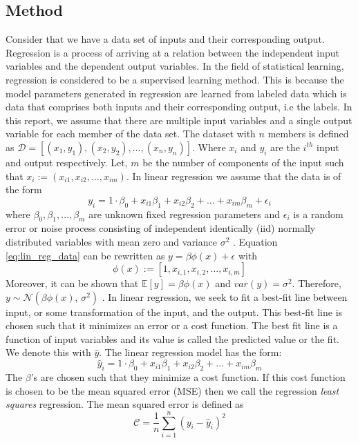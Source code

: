 \subsection{Method} \label{subsec:method_linear_regression}

Consider that we have a data set of inputs and their corresponding output. Regression is a process of arriving at a relation between the independent input variables and the dependent output variables. In the field of statistical learning, regression is considered to be a supervised learning method. This is because the model parameters generated in regression are learned from labeled data which is data that comprises both inputs and their corresponding output, i.e the labels. In this report, we assume that there are multiple input variables and a single output variable for each member of the data set.
\newline \newline
The dataset with $n$ members is defined as $\mathcal{D} = [({x}_1, y_1 ), ({x}_2, y_2 ), ..., ({x}_n, y_n )]$. Where ${x}_i$ and $y_i$  are the $i^{th}$ input and output respectively. Let, $m$ be the number of components of the input such that ${x}_i := (x_{i1}, x_{i2}, ..., x_{im})$. In linear regression we assume that the data is of the form
\begin{equation}
    {y}_i = 1 \cdot\beta_0 + x_{i1}\beta_1 + x_{i2}\beta_2 + ... + x_{im}\beta_m + \epsilon_i \label{eq:lin_reg_data}
\end{equation}
where $\beta_0, \beta_1, \dots, \beta_m$ are unknown fixed regression parameters and $\epsilon_i$ is a random error or noise process consisting of independent identically (iid) normally distributed variables with mean zero and variance $\sigma^2$ \cite{shumway_time_2017}. Equation \ref{eq:lin_reg_data} can be rewritten as $y=\beta \phi(x) + \epsilon$ with
\begin{equation}
    \phi(x):=[1, x_{i,1}, x_{i,2}, \dots, x_{i,m}]
\end{equation}
Moreover, it can be shown that $\mathbb{E}[y] = \beta \phi(x)$ and $var(y) = \sigma^2$. Therefore, $y \sim \mathcal{N}(\beta \phi(x),\,\sigma^{2})$ \cite{murphy_machine_2012}.
\newline \newline
In linear regression, we seek to fit a best-fit line between input, or some transformation of the input, and the output. This best-fit line is chosen such that it minimizes an error or a cost function. The best fit line is a function of input variables and its value is called the predicted value or the fit. We denote this with $\hat{y}$. The linear regression model has the form:
\begin{equation}
    \hat{y}_i = 1 \cdot\beta_0 + x_{i1}\beta_1 + x_{i2}\beta_2 + ... + x_{im}\beta_m
\end{equation}
The $\beta$'s are chosen such that they minimize a cost function. If this cost function is chosen to be the mean squared error (MSE) then we call the regression \textit{least squares} regression. The mean squared error is defined as 
\begin{equation}
    \mathcal{C} = \frac{1}{n}\sum_{i=1}^{n}(y_i-\hat{y}_i)^2 \label{eq:cost_function_sum}
\end{equation}

